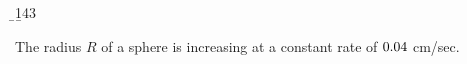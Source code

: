 



\SQUARE\vr\vs
\EXPR[2]

\CUBE\vd\b
\FRACMULT\b{1}{4}{3}\vv\vw

\EXPR[2]

\question The radius $R$ of a sphere is increasing at a constant rate of 
 $0.04$ cm/sec. 

 \watchout

